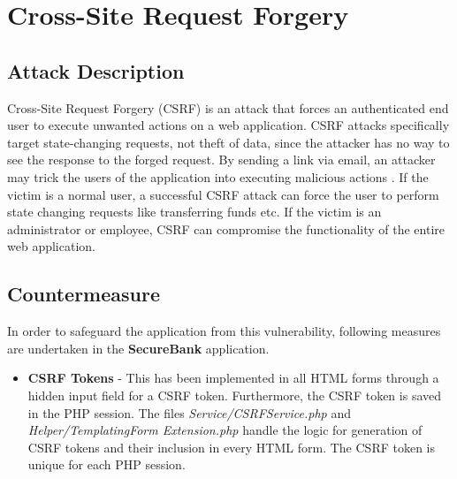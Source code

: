 \section{Cross-Site Request Forgery}

\subsection{Attack Description}
Cross-Site Request Forgery (CSRF) is an attack that forces an authenticated end user to execute unwanted actions on a web application. CSRF attacks specifically target state-changing requests, not theft of data, since the attacker has no way to see the response to the forged request. By sending a link via email, an attacker may trick the users of the application into executing malicious actions . If the victim is a normal user, a successful CSRF attack can force the user to perform state changing requests like transferring funds etc. If the victim is an administrator or employee, CSRF can compromise the functionality of the entire web application.

\subsection{Countermeasure}
In order to safeguard the application from this vulnerability, following measures are undertaken in the \textbf{SecureBank} application.
\begin{itemize}
\item \textbf{CSRF Tokens} - This has been implemented in all HTML forms through a hidden input field for a CSRF token. Furthermore, the CSRF token is saved in the PHP session. The files \textit{Service/CSRFService.php} and  \textit{Helper/TemplatingForm
Extension.php} handle the logic for generation of  CSRF tokens and their inclusion in every HTML form. The CSRF token is unique for each PHP session.
\end{itemize}

\clearpage